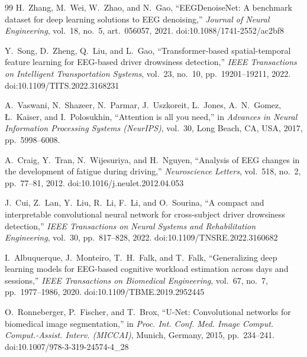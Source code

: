 \documentclass[conference]{IEEEtran}
\begin{document}
\begin{thebibliography}{99}
H.~Zhang, M.~Wei, W.~Zhao, and N.~Gao,
``EEGDenoiseNet: A benchmark dataset for deep learning solutions to EEG denoising,''
\emph{Journal of Neural Engineering}, vol.~18, no.~5, art.~056057, 2021.
doi:10.1088/1741-2552/ac2bf8

Y.~Song, D.~Zheng, Q.~Liu, and L.~Gao,
``Transformer-based spatial-temporal feature learning for EEG-based driver drowsiness detection,''
\emph{IEEE Transactions on Intelligent Transportation Systems}, vol.~23, no.~10, pp.~19201--19211, 2022.
doi:10.1109/TITS.2022.3168231

A.~Vaswani, N.~Shazeer, N.~Parmar, J.~Uszkoreit, L.~Jones, A.~N.~Gomez, \L.~Kaiser, and I.~Polosukhin,
``Attention is all you need,''
in \emph{Advances in Neural Information Processing Systems (NeurIPS)}, vol.~30, Long Beach, CA, USA, 2017, pp.~5998--6008.

A.~Craig, Y.~Tran, N.~Wijesuriya, and H.~Nguyen,
``Analysis of EEG changes in the development of fatigue during driving,''
\emph{Neuroscience Letters}, vol.~518, no.~2, pp.~77--81, 2012.
doi:10.1016/j.neulet.2012.04.053

J.~Cui, Z.~Lan, Y.~Liu, R.~Li, F.~Li, and O.~Sourina,
``A compact and interpretable convolutional neural network for cross-subject driver drowsiness detection,''
\emph{IEEE Transactions on Neural Systems and Rehabilitation Engineering}, vol.~30, pp.~817--828, 2022.
doi:10.1109/TNSRE.2022.3160682

I.~Albuquerque, J.~Monteiro, T.~H.~Falk, and T.~Falk,
``Generalizing deep learning models for EEG-based cognitive workload estimation across days and sessions,''
\emph{IEEE Transactions on Biomedical Engineering}, vol.~67, no.~7, pp.~1977--1986, 2020.
doi:10.1109/TBME.2019.2952445

O.~Ronneberger, P.~Fischer, and T.~Brox,
``U-Net: Convolutional networks for biomedical image segmentation,''
in \emph{Proc. Int. Conf. Med. Image Comput. Comput.-Assist. Interv. (MICCAI)}, Munich, Germany, 2015, pp.~234--241.
doi:10.1007/978-3-319-24574-4\_28

\end{thebibliography}
\end{document}
